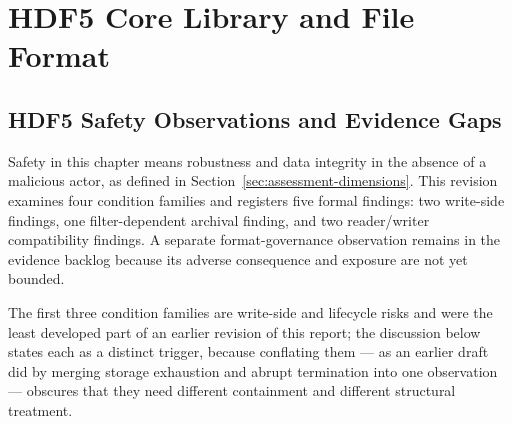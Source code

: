 \documentclass[../main.tex]{subfiles}
\begin{document}
\section{HDF5 Core Library and File Format}
\label{sec:core-lib-format}

\subsection{HDF5 Safety Observations and Evidence Gaps}

Safety in this chapter means robustness and data integrity in the absence of a
malicious actor, as defined in Section~\ref{sec:assessment-dimensions}. This
revision examines four condition families and registers five formal findings:
two write-side findings, one filter-dependent archival finding, and two
reader/writer compatibility findings. A separate format-governance observation
remains in the evidence backlog because its adverse consequence and exposure
are not yet bounded.

The first three condition families are write-side and lifecycle risks and were the least developed part of
an earlier revision of this report; the discussion below states each as a
distinct trigger, because conflating them --- as an earlier draft did by
merging storage exhaustion and abrupt termination into one observation ---
obscures that they need different containment and different structural
treatment.
\end{document}
